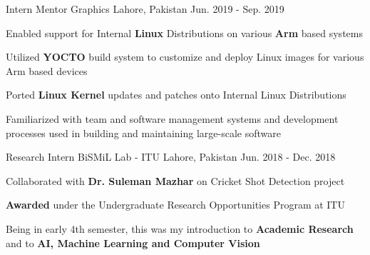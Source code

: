 \begin{cventries}
  \cventry
    {Intern} %
    {Mentor Graphics} %
    {Lahore, Pakistan} %
    {Jun. 2019 - Sep. 2019} %
    {
      \begin{cvitems} %
        \item Enabled support for Internal \textbf{Linux} Distributions on various \textbf{Arm }based systems
        \item Utilized \textbf{YOCTO} build system to customize and deploy Linux images for various Arm based devices
        \item Ported \textbf{Linux Kernel} updates and patches onto Internal Linux Distributions
        \item Familiarized with team and software management systems and development processes used in building and maintaining large-scale software
      \end{cvitems}
    }

  \cventry
    {Research Intern} %
    {BiSMiL Lab - ITU} %
    {Lahore, Pakistan} %
    {Jun. 2018 - Dec. 2018} %
    {
      \begin{cvitems} %
        \item Collaborated with \textbf{Dr. Suleman Mazhar} on Cricket Shot Detection project
        \item \textbf{Awarded} under the Undergraduate Research Opportunities Program at ITU
        \item Being in early 4th semester, this was my introduction to \textbf{Academic Research} and to \textbf{AI, Machine Learning and Computer Vision}
      \end{cvitems}
    }

\end{cventries}
